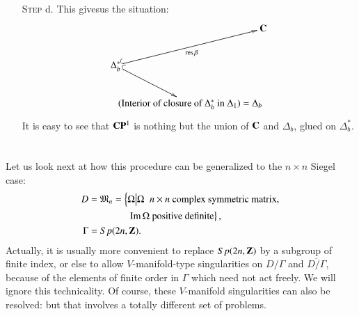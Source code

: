 \begin{itemize}
\item[\textsc{Step} d.] This gives\pageoriginale us the situation:
$$
\xymatrix@R=0.3cm@C=-0.3cm{
& &  \bC\\
&&&\\
\Delta^\ast_b \ar@{^{(}->}[uurr]_{\res \beta} \ar@{^{(}->}[ddr]& & \\
& & & \\
& (\text{Interior of closure of $\Delta^\ast_b$ in  $\Delta_1$}) = \Delta_b &
}
$$
It is easy to see that $\mathbf{C}\mathbf{P}^1$ is nothing but the union of $\mathbf{C}$ and $\Delta_b$, glued on $\Delta^\ast_b$.
\end{itemize}

\section{}\label{art8-sec2}
Let us look next at how this procedure can be generalized to the $n \times n$ Siegel case:
\begin{align*}
D & = \mathfrak{M}_n = \left\{ \Omega \big| \Omega \;\; n \times n \text{ complex symmetric matrix,} \right.\\
& \qquad \qquad \left. \operatorname{Im} \Omega \text{ positive definite} \right\},\\
\Gamma & = Sp (2n, \mathbf{Z}).
\end{align*}
Actually, it is usually more convenient to replace $Sp (2n,\mathbf{Z})$ by a subgroup of finite index, or else to allow $V$-manifold-type singularities on $D/\Gamma$ and $\overline{D/\Gamma}$, because of the elements of finite order in $\Gamma$ which need not act freely. We will ignore this technicality. Of course, these $V$-manifold singularities can also be resolved: but that involves a totally different set of problems.

